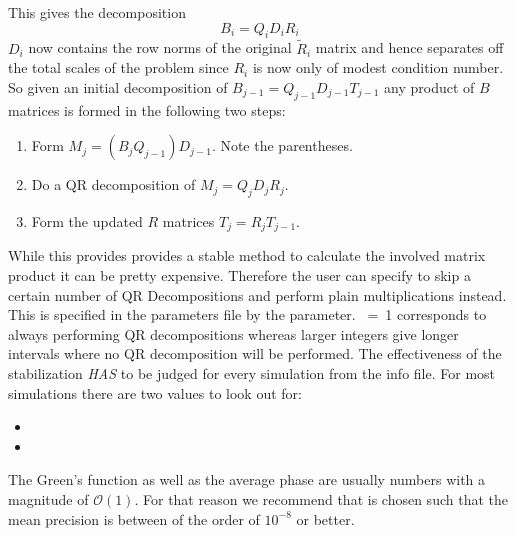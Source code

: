 This gives the decomposition
\begin{equation}
B_i = Q_i D_i R_i
\end{equation}
$D_i$ now contains the row norms of the original $\tilde{R}_i$ matrix and hence separates off the total scales of the problem since $R_i$ is now only of modest condition number.
So given an initial decomposition of $B_{j-1} = Q_{j-1} D_{j-1} T_{j-1}$ any product 
of $B$ matrices is formed in the following two steps:
\begin{enumerate}
\item Form $ M_j = (B_j Q_{j-1}) D_{j-1}$. Note the parentheses.
\item Do a QR decomposition of $M_j = Q_j D_j R_j$.
\item Form the updated $R$ matrices $T_j = R_j T_{j-1}$.
\end{enumerate}
While this provides provides a stable method to calculate the involved matrix product
it can be pretty expensive. Therefore the user can specify to skip a certain number of 
QR Decompositions and perform plain multiplications instead. This is specified in the parameters file by the  parameter.
~=~1 corresponds to always performing QR decompositions whereas larger integers give longer intervals where no QR decomposition will be performed.
The effectiveness of the stabilization \emph{HAS} to be judged for every simulation from the info
file. For most simulations there are two values to look out for:
\begin{itemize}
\item {}
\item {}
\end{itemize}
The Green's function as well as the average phase are usually numbers with a magnitude of $\mathcal{O} (1)$. 
For that reason we recommend that  is chosen such that the mean precision is between of the order of $10^{-8}$  or better.  